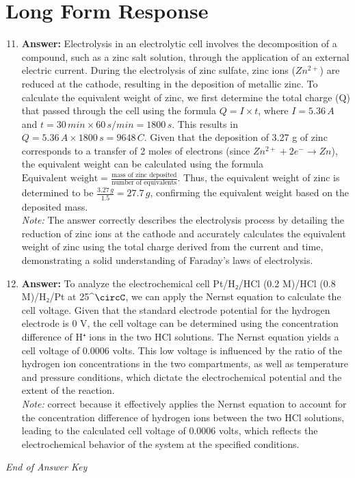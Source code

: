 \documentclass[12pt]{article}
\begin{document}
\section*{Long Form Response}
\begin{enumerate}[label=\arabic*.]
\setcounter{enumi}{10}
\item \textbf{Answer:} Electrolysis in an electrolytic cell involves the decomposition of a compound, such as a zinc salt solution, through the application of an external electric current. During the electrolysis of zinc sulfate, zinc ions (\(Zn^{2+}\)) are reduced at the cathode, resulting in the deposition of metallic zinc. To calculate the equivalent weight of zinc, we first determine the total charge (Q) that passed through the cell using the formula \(Q = I \times t\), where \(I = 5.36 \, A\) and \(t = 30 \, min \times 60 \, s/min = 1800 \, s\). This results in \(Q = 5.36 \, A \times 1800 \, s = 9648 \, C\). Given that the deposition of 3.27 g of zinc corresponds to a transfer of 2 moles of electrons (since \(Zn^{2+} + 2 e^- \rightarrow Zn\)), the equivalent weight can be calculated using the formula \( \text{Equivalent weight} = \frac{\text{mass of zinc deposited}}{\text{number of equivalents}} \). Thus, the equivalent weight of zinc is determined to be \( \frac{3.27 \, g}{1.5} = 27.7 \, g\), confirming the equivalent weight based on the deposited mass.
\\ \textit{Note:} The answer correctly describes the electrolysis process by detailing the reduction of zinc ions at the cathode and accurately calculates the equivalent weight of zinc using the total charge derived from the current and time, demonstrating a solid understanding of Faraday's laws of electrolysis.
\item \textbf{Answer:} To analyze the electrochemical cell Pt/H₂/HCl (0.2 M)/HCl (0.8 M)/H₂/Pt at 25^\ensuremath{\circC}, we can apply the Nernst equation to calculate the cell voltage. Given that the standard electrode potential for the hydrogen electrode is 0 V, the cell voltage can be determined using the concentration difference of H⁺ ions in the two HCl solutions. The Nernst equation yields a cell voltage of 0.0006 volts. This low voltage is influenced by the ratio of the hydrogen ion concentrations in the two compartments, as well as temperature and pressure conditions, which dictate the electrochemical potential and the extent of the reaction.
\\ \textit{Note:} correct because it effectively applies the Nernst equation to account for the concentration difference of hydrogen ions between the two HCl solutions, leading to the calculated cell voltage of 0.0006 volts, which reflects the electrochemical behavior of the system at the specified conditions.
\end{enumerate}

\vfill
\noindent\textit{End of Answer Key}
\end{document}
